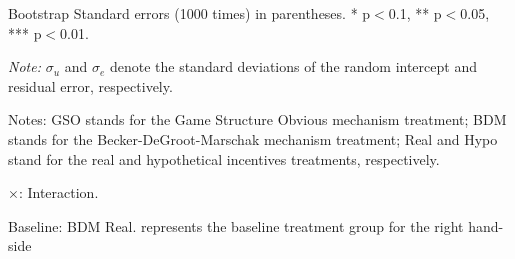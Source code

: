 \documentclass[12pt]{article}
\begin{document}
\begin{table}[H]
\begin{tablenotes}
            \footnotesize
            \item Bootstrap Standard errors (1000 times) in parentheses. * p$<$0.1, ** p$<$0.05, *** p$<$0.01.
            \item \textit{Note:} $\sigma_u$ and $\sigma_e$ denote the standard deviations of the random intercept and residual error, respectively.
            \item Notes: GSO stands for the Game Structure Obvious mechanism treatment; BDM stands for the Becker-DeGroot-Marschak mechanism treatment; Real and Hypo stand for the real and hypothetical incentives treatments, respectively.
           \item $\times$: Interaction.
           \item Baseline: BDM Real. represents the baseline treatment group for the right hand-side \\
        \end{tablenotes}
\end{table}



\clearpage
\end{document}
